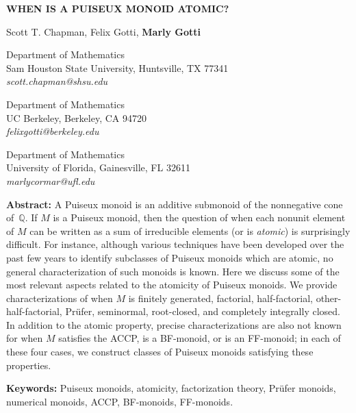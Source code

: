 \documentclass[11pt]{article}
\newcommand{\titleA}[1]{\begin{center} \textbf{\large #1}\end{center}}
\newcommand{\authorA}[1]{\begin{center} #1 \end{center}}
\newcommand{\addressA}[2]{\begin{center}  #1 \textit{#2} \end{center} }
\newcommand{\researcharea}[1]{\noindent \textbf{General area of research:} #1  }
\newcommand{\abstractA}[1]{\medskip  \noindent \textbf{Abstract:} #1}
\newcommand{\keywordsA}[1]{\medskip \noindent \textbf{Keywords:} #1}
\begin{document}
{
}
\rhead{}

\titleA{WHEN IS A PUISEUX MONOID ATOMIC?}

\authorA{Scott T. Chapman, Felix Gotti, {\bf Marly Gotti}}

\addressA{Department of Mathematics\\
	Sam Houston State University, Huntsville, TX 77341 \\
	{\it scott.chapman@shsu.edu}
	\vspace{1pt}
	
	Department of Mathematics\\
	UC Berkeley, Berkeley, CA 94720 \\
	{\it felixgotti@berkeley.edu}
	\vspace{1pt}
	
	Department of Mathematics\\
	University of Florida, Gainesville, FL 32611 \\
	{\it marlycormar@ufl.edu}
}\\

\abstractA{
		A Puiseux monoid is an additive submonoid of the nonnegative cone of~$\mathbb{Q}$. If $M$ is a Puiseux monoid, then the question of when each nonunit element of $M$ can be written as a sum of irreducible elements (or is \textit{atomic}) is surprisingly difficult.  For instance, although various techniques have been developed over the past few years to identify subclasses of Puiseux monoids which are atomic, no general characterization of such monoids is known. Here we discuss some of the most relevant aspects related to the atomicity of Puiseux monoids. We provide characterizations of when $M$ is finitely generated, factorial, half-factorial, other-half-factorial, Pr\"ufer, seminormal, root-closed, and completely integrally closed. In addition to the atomic property, precise characterizations are also not known for when $M$ satisfies the ACCP, is a BF-monoid, or is an FF-monoid; in each of these four cases, we construct classes of Puiseux monoids satisfying these properties. 

}

\keywordsA{Puiseux monoids, atomicity, factorization theory, Pr\"ufer monoids, numerical monoids, ACCP, BF-monoids, FF-monoids.} \\
\end{document}
